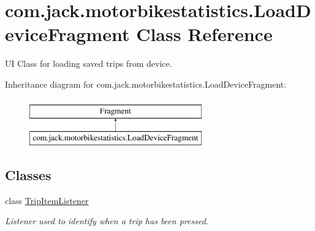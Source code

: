 \hypertarget{classcom_1_1jack_1_1motorbikestatistics_1_1_load_device_fragment}{}\section{com.\+jack.\+motorbikestatistics.\+Load\+Device\+Fragment Class Reference}
\label{classcom_1_1jack_1_1motorbikestatistics_1_1_load_device_fragment}


UI Class for loading saved trips from device.  


Inheritance diagram for com.\+jack.\+motorbikestatistics.\+Load\+Device\+Fragment\+:\begin{figure}[H]
\begin{center}
\leavevmode
\includegraphics[height=2.000000cm]{classcom_1_1jack_1_1motorbikestatistics_1_1_load_device_fragment}
\end{center}
\end{figure}
\subsection*{Classes}
\begin{DoxyCompactItemize}
\item 
class \hyperlink{classcom_1_1jack_1_1motorbikestatistics_1_1_load_device_fragment_1_1_trip_item_listener}{Trip\+Item\+Listener}
\begin{DoxyCompactList}\small\item\em Listener used to identify when a trip has been pressed. \end{DoxyCompactList}\end{DoxyCompactItemize}
